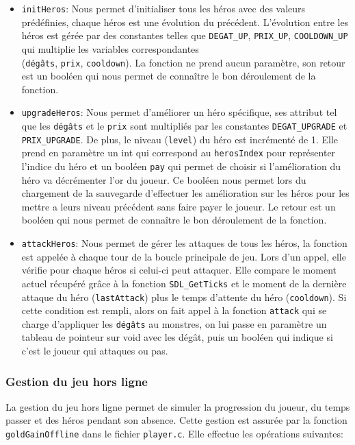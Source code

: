 \documentclass[11pt,a4paper]{article}
\begin{document}
\begin{itemize}
    \item \texttt{initHeros}: Nous permet d'initialiser tous les héros avec des valeurs prédéfinies, chaque héros est une évolution du précédent. L'évolution entre les héros est gérée par des constantes telles que \texttt{DEGAT\_UP}, \texttt{PRIX\_UP}, \texttt{COOLDOWN\_UP} qui multiplie les variables correspondantes\\(\texttt{dégâts}, \texttt{prix}, \texttt{cooldown}). La fonction ne prend aucun paramètre, son retour est un booléen qui nous permet de connaître le bon déroulement de la fonction.
    \item \texttt{upgradeHeros}: Nous permet d'améliorer un héro spécifique, ses attribut tel que les \texttt{dégâts} et le \texttt{prix} sont multipliés par les constantes \texttt{DEGAT\_UPGRADE} et \texttt{PRIX\_UPGRADE}. De plus, le niveau (\texttt{level}) du héro est incrémenté de 1.  Elle prend en paramètre un int qui correspond au \texttt{herosIndex} pour représenter l’indice du héro et un booléen \texttt{pay} qui permet de choisir si l'amélioration du héro va décrémenter l’or du joueur. Ce booléen nous permet lors du chargement de la sauvegarde d'effectuer les amélioration sur les héros pour les mettre a leurs niveau précédent sans faire payer le joueur. Le retour est un booléen qui nous permet de connaître le bon déroulement de la fonction. 
\item \texttt{attackHeros}: Nous permet de gérer les attaques de tous les héros, la fonction est appelée à chaque tour de la boucle principale de jeu. Lors d’un appel, elle vérifie pour chaque héros si celui-ci peut attaquer. Elle compare le moment actuel récupéré grâce à la fonction \texttt{SDL\_GetTicks} et le moment de la dernière attaque du héro (\texttt{lastAttack}) plus le temps d'attente du héro (\texttt{cooldown}). Si cette condition est rempli, alors on fait appel à la fonction \texttt{attack} qui se charge d'appliquer les \texttt{dégâts} au monstres, on lui passe en paramètre un tableau de pointeur sur void avec les dégât, puis un booléen qui indique si c’est le joueur qui attaques ou pas.
\end{itemize}

\subsubsection{Gestion du jeu hors ligne}
La gestion du jeu hors ligne permet de simuler la progression du joueur, du temps passer et des héros pendant son absence. Cette gestion est assurée par la fonction \texttt{goldGainOffline} dans le fichier \texttt{player.c}. Elle effectue les opérations suivantes:
\end{document}
